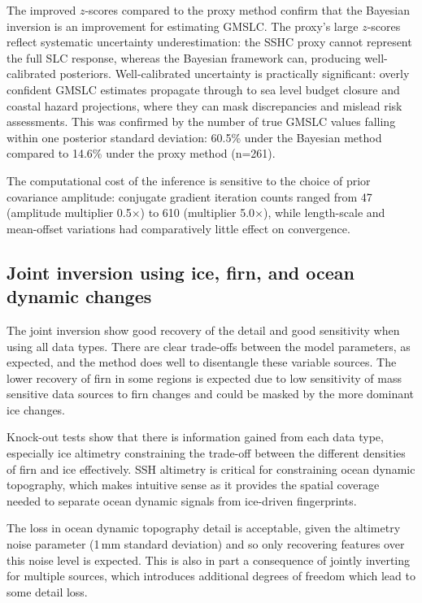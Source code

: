 The improved $z$-scores compared to the proxy method confirm that the Bayesian inversion is an improvement for estimating GMSLC. The proxy's large $z$-scores reflect systematic uncertainty underestimation: the SSHC proxy cannot represent the full SLC response, whereas the Bayesian framework can, producing well-calibrated posteriors. Well-calibrated uncertainty is practically significant: overly confident GMSLC estimates propagate through to sea level budget closure and coastal hazard projections, where they can mask discrepancies and mislead risk assessments. This was confirmed by the number of true GMSLC values falling within one posterior standard deviation: 60.5\% under the Bayesian method compared to 14.6\% under the proxy method (n=261).

The computational cost of the inference is sensitive to the choice of prior covariance amplitude: conjugate gradient iteration counts ranged from 47 (amplitude multiplier 0.5$\times$) to 610 (multiplier 5.0$\times$), while length-scale and mean-offset variations had comparatively little effect on convergence.

\subsection{Joint inversion using ice, firn, and ocean dynamic changes}

The joint inversion show good recovery of the detail and good sensitivity when using all data types. There are clear trade-offs between the model parameters, as expected, and the method does well to disentangle these variable sources. The lower recovery of firn in some regions is expected due to low sensitivity of mass sensitive data sources to firn changes and could be masked by the more dominant ice changes.

Knock-out tests show that there is information gained from each data type, especially ice altimetry constraining the trade-off between the different densities of firn and ice effectively. SSH altimetry is critical for constraining ocean dynamic topography, which makes intuitive sense as it provides the spatial coverage needed to separate ocean dynamic signals from ice-driven fingerprints.

The loss in ocean dynamic topography detail is acceptable, given the altimetry noise parameter (1\,mm standard deviation) and so only recovering features over this noise level is expected. This is also in part a consequence of jointly inverting for multiple sources, which introduces additional degrees of freedom which lead to some detail loss.
